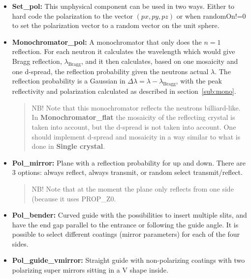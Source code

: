 \begin{itemize}
\item \textbf{Set\_pol:} This unphysical component can be used in two
ways. Either to hard code the polarization to the vector $(px, py, pz)$
or when randomOn!=0 to set the polarization vector to a random vector
on the unit sphere.\\
  
\item \textbf{Monochromator\_pol:} A monochromator that only does the $n=1$
  reflection. For each neutron it calculates the wavelength which would give
  Bragg reflection, $\lambda_\text{Bragg}$, and it then calculates, based on
  one mosaicity and one d-spread, the reflection probability given the neutrons
  actual $\lambda$.  The reflection probability is a Gaussian in $\Delta
  \lambda = \lambda - \lambda_\text{Bragg}$, with the peak reflectivity and
  polarization calculated as described in section~\ref{sub:mono}.

  \begin{quote}
    NB! Note that this monochromator reflects the neutrons billiard-like. In
    \textbf{Monochromator\_flat} the mosaicity of the reflecting crystal is
    taken into account, but the d-spread is not taken into account. One should
    implement d-spread and mosaicity in a way similar to what is done in
    \textbf{Single crystal}.
  \end{quote}

\item \textbf{Pol\_mirror:} Plane with a reflection probability for up
and down. There are 3 options: always reflect, always transmit, or
random select transmit/reflect. 

\begin{quote}
  NB! Note that at the moment the plane only reflects from one side (because
  it uses PROP\_Z0.
\end{quote}

\item \textbf{Pol\_bender:} Curved guide with the possibilities to
  insert multiple slits, and have the end gap parallel to the entrance
  or following the guide angle. It is possible to select different
  coatings (mirror parameters) for each of the four sides.\\

\item \textbf{Pol\_guide\_vmirror:} Straight guide with non-polarizing
  coatings with two polarizing super mirrors sitting in a V shape
  inside. \\
\end{itemize}

